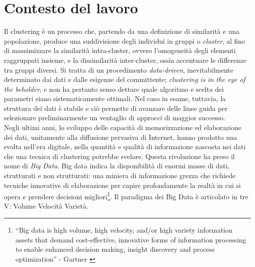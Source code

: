 \section{Contesto del lavoro}
Il clustering \`e un processo che, partendo da una definizione di similarit\`a e una popolazione, produce una suddivisione degli individui in gruppi o \textit{cluster}, al fine di massimizzare la similarit\`a intra-cluster, ovvero l'omogeneit\`a degli elementi raggruppati insieme, e la dissimilarit\`a inter-cluster, ossia accentuare le differenze tra gruppi diversi. Si tratta di un procedimento \textit{data-driven}, inevitabilmente determinato dai dati e dalle esigenze del committente; \textit{clustering is in the eye of the beholder}, e non ha pertanto senso dettare quale algoritmo e scelta dei parametri siano sistematicamente ottimali. Nel caso in esame, tuttavia, la struttura dei dati \`e stabile e ci\`o permette di avanzare delle linee guida per selezionare preliminarmente un ventaglio di approcci di maggior successo.\\
Negli ultimi anni, lo sviluppo delle capacit\`a di memorizzazione ed elaborazione dei dati, unitamente alla diffusione pervasiva di Internet, hanno prodotto una svolta nell'era digitale, nella quantit\`a e qualit\`a di informazione nascosta nei dati che una tecnica di clustering potrebbe svelare. Questa rivoluzione ha preso il nome di \textit{Big Data}. Big data indica la disponibilit\`a di enormi masse di dati, strutturati e non strutturati: una miniera di informazione grezza che richiede tecniche innovative di elaborazione per capire profondamente la realt\`a in cui si opera e prendere decisioni migliori\footnote{``Big data is high volume, high velocity, and/or high variety information assets that demand cost-effective, innovative forms of information processing to enable enhanced decision making, insight discovery and process optimization'' - Gartner \cite{laney01}}.
Il paradigma dei Big Data \`e articolato in tre V: Volume Velocit\`a Variet\`a.
